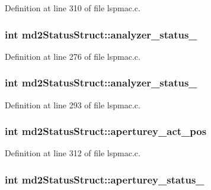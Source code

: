 Definition at line 310 of file lspmac.\-c.

\hypertarget{structmd2StatusStruct_ab876b484f55bcce576fcd89dcc3f7267}{
\subsubsection[{analyzer\-\_\-status\-\_\-1}]{\setlength{\rightskip}{0pt plus 5cm}int md2\-Status\-Struct\-::analyzer\-\_\-status\-\_}}\label{structmd2StatusStruct_ab876b484f55bcce576fcd89dcc3f7267}


Definition at line 276 of file lspmac.\-c.

\hypertarget{structmd2StatusStruct_a4f88bb778e4e18f1fbf7672ac11e7433}{
\subsubsection[{analyzer\-\_\-status\-\_\-2}]{\setlength{\rightskip}{0pt plus 5cm}int md2\-Status\-Struct\-::analyzer\-\_\-status\-\_}}\label{structmd2StatusStruct_a4f88bb778e4e18f1fbf7672ac11e7433}


Definition at line 293 of file lspmac.\-c.

\hypertarget{structmd2StatusStruct_a2a434d2b57dbb669de0765486a1516ff}{
\subsubsection[{aperturey\-\_\-act\-\_\-pos}]{\setlength{\rightskip}{0pt plus 5cm}int md2\-Status\-Struct\-::aperturey\-\_\-act\-\_\-pos}}\label{structmd2StatusStruct_a2a434d2b57dbb669de0765486a1516ff}


Definition at line 312 of file lspmac.\-c.

\hypertarget{structmd2StatusStruct_a2ef953eaddf7058bf4276585e6ff066b}{
\subsubsection[{aperturey\-\_\-status\-\_\-1}]{\setlength{\rightskip}{0pt plus 5cm}int md2\-Status\-Struct\-::aperturey\-\_\-status\-\_}}\label{structmd2StatusStruct_a2ef953eaddf7058bf4276585e6ff066b}


